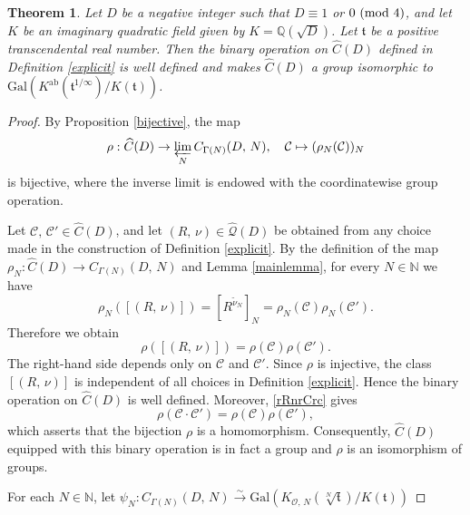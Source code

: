 \documentclass[reqno,11pt]{article}
\newcommand{\Mod}[1]{\ (\textup{mod}\ #1)}
\theoremstyle{plain} %
\newtheorem{theorem}{\indent\sc Theorem}[section]
\theoremstyle{definition} %
\begin{document}
\begin{theorem}\label{main}
Let $D$ be a negative integer such that $D\equiv1$ or $0\Mod{4}$, 
and let $K$ be an imaginary quadratic field given by $K=\mathbb{Q}(\sqrt{D})$. 
Let $\mathfrak{t}$ be a positive transcendental real number.
Then the binary operation on $\widehat{C}(D)$ defined in Definition \ref{explicit}
is well defined and makes
$\widehat{C}(D)$ a group isomorphic to $\mathrm{Gal}\left(K^\mathrm{ab}(\mathfrak{t}^{1/\infty})/K(\mathfrak{t})\right)$.
\end{theorem}
\begin{proof}
By Proposition \ref{bijective}, the map
\begin{equation*}
\rho:\widehat{C}(D)\rightarrow
\varprojlim_N C_{\Gamma(N)}(D,\,N),\quad
\mathcal{C}\mapsto(\rho_N(\mathcal{C}))_N
\end{equation*}
is bijective, where the inverse limit is endowed with the
coordinatewise group operation.
\par
Let $\mathcal{C},\,\mathcal{C}'\in\widehat{C}(D)$, and let
$(R,\,\nu)\in\widehat{\mathcal{Q}}(D)$ be obtained from any choice made in
the construction of Definition \ref{explicit}. 
By the definition of the map $\rho_N:\widehat{C}(D)\rightarrow C_{\Gamma(N)}(D,\,N)$
and Lemma \ref{mainlemma}, for every \(N\in\mathbb{N}\) we have
\begin{equation*}
\rho_N([(R,\,\nu)])=[R^{\widetilde{\nu}_N}]_N
=\rho_N(\mathcal{C})\rho_N(\mathcal{C}').
\end{equation*}
Therefore we obtain
\begin{equation}\label{rRnrCrc}
\rho([(R,\,\nu)])
=\rho(\mathcal{C})\rho(\mathcal{C}').
\end{equation}
The right-hand side depends only on $\mathcal{C}$ and $\mathcal{C}'$.
Since $\rho$ is injective, the class $[(R,\,\nu)]$ is independent of all
choices in Definition \ref{explicit}. Hence the binary operation on 
$\widehat{C}(D)$ is well
defined. Moreover, \eqref{rRnrCrc} gives
\begin{equation*}
\rho(\mathcal{C}\cdot\mathcal{C}')
=\rho(\mathcal{C})\rho(\mathcal{C}'),
\end{equation*}
which asserts that the bijection $\rho$ is a homomorphism. Consequently,
$\widehat{C}(D)$ equipped with this binary operation is in fact a group and
$\rho$ is an isomorphism of groups. 
\par
For each $N\in\mathbb{N}$, 
let $\psi_N:C_{\Gamma(N)}(D,\,N)\stackrel{\sim}{\rightarrow}
\mathrm{Gal}\left(K_{\mathcal{O},\,N}(\sqrt[N]{\mathfrak{t}})/K(\mathfrak{t})\right)$

\end{proof}
\end{document}
